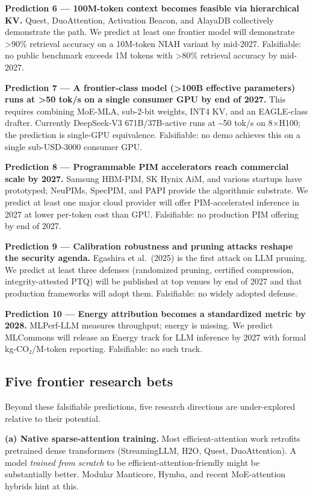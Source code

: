 \documentclass{article}
\begin{document}
\textbf{Prediction 6 --- 100M-token context becomes feasible via hierarchical KV.} Quest, DuoAttention, Activation Beacon, and AlayaDB \citep{deng20252025} collectively demonstrate the path. We predict at least one frontier model will demonstrate \textgreater90\% retrieval accuracy on a 10M-token NIAH variant by mid-2027. Falsifiable: no public benchmark exceeds 1M tokens with \textgreater80\% retrieval accuracy by mid-2027.

\textbf{Prediction 7 --- A frontier-class model (\textgreater100B effective parameters) runs at \textgreater50 tok/s on a single consumer GPU by end of 2027.} This requires combining MoE-MLA, sub-2-bit weights, INT4 KV, and an EAGLE-class drafter. Currently DeepSeek-V3 671B/37B-active runs at \textasciitilde50 tok/s on 8×H100; the prediction is single-GPU equivalence. Falsifiable: no demo achieves this on a single sub-USD-3000 consumer GPU.

\textbf{Prediction 8 --- Programmable PIM accelerators reach commercial scale by 2027.} Samsung HBM-PIM, SK Hynix AiM, and various startups have prototyped; NeuPIMs, SpecPIM, and PAPI provide the algorithmic substrate. We predict at least one major cloud provider will offer PIM-accelerated inference in 2027 at lower per-token cost than GPU. Falsifiable: no production PIM offering by end of 2027.

\textbf{Prediction 9 --- Calibration robustness and pruning attacks reshape the security agenda.} Egashira et al.~(2025) is the first attack on LLM pruning. We predict at least three defenses (randomized pruning, certified compression, integrity-attested PTQ) will be published at top venues by end of 2027 and that production frameworks will adopt them. Falsifiable: no widely adopted defense.

\textbf{Prediction 10 --- Energy attribution becomes a standardized metric by 2028.} MLPerf-LLM measures throughput; energy is missing. We predict MLCommons will release an Energy track for LLM inference by 2027 with formal kg-CO₂/M-token reporting. Falsifiable: no such track.

\subsection{Five frontier research bets}\label{five-frontier-research-bets}

Beyond these falsifiable predictions, five research directions are under-explored relative to their potential.

\textbf{(a) Native sparse-attention training.} Most efficient-attention work retrofits pretrained dense transformers (StreamingLLM, H2O, Quest, DuoAttention). A model \emph{trained from scratch} to be efficient-attention-friendly might be substantially better. Modular Manticore, Hymba, and recent MoE-attention hybrids hint at this.
\end{document}
